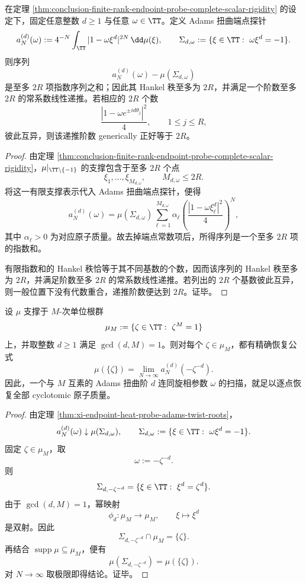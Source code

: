 \begin{corollary}\label{cor:conclusion-finite-rank-endpoint-probe-uniform-adams-recursion-closure}
在定理 \ref{thm:conclusion-finite-rank-endpoint-probe-complete-scalar-rigidity} 的设定下，固定任意整数 \(d\ge1\) 与任意 \(\omega\in\TT\)。定义 Adams 扭曲端点探针
\[
a_N^{(d)}(\omega):=
4^{-N}\int_{\TT}|1-\omega\xi^d|^{2N}\,\dd\mu(\xi),
\qquad
\Sigma_{d,\omega}:=\{\xi\in\TT:\ \omega\xi^d=-1\}.
\]
则序列
\[
a_N^{(d)}(\omega)-\mu(\Sigma_{d,\omega})
\]
是至多 \(2R\) 项指数序列之和；因此其 Hankel 秩至多为 \(2R\)，并满足一个阶数至多 \(2R\) 的常系数线性递推。若相应的 \(2R\) 个数
\[
\frac{|1-\omega e^{\pm i d\theta_j}|^2}{4},
\qquad 1\le j\le R,
\]
彼此互异，则该递推阶数 generically 正好等于 \(2R\)。
\end{corollary}
\begin{proof}
由定理 \ref{thm:conclusion-finite-rank-endpoint-probe-complete-scalar-rigidity}，\(\mu|_{\TT\setminus\{-1\}}\) 的支撑包含于至多 \(2R\) 个点
\[
\xi_1,\dots,\xi_{M_{d,\omega}},
\qquad M_{d,\omega}\le 2R.
\]
将这一有限支撑表示代入 Adams 扭曲端点探针，便得
\[
a_N^{(d)}(\omega)
=
\mu(\Sigma_{d,\omega})
\sum_{\ell=1}^{M_{d,\omega}}
\alpha_\ell
\left(\frac{|1-\omega\xi_\ell^d|^2}{4}\right)^N,
\]
其中 \(\alpha_\ell>0\) 为对应原子质量。故去掉端点常数项后，所得序列是一个至多 \(2R\) 项的指数和。

有限指数和的 Hankel 秩恰等于其不同基数的个数，因而该序列的 Hankel 秩至多为 \(2R\)，并满足阶数至多 \(2R\) 的常系数线性递推。若列出的 \(2R\) 个基数彼此互异，则一般位置下没有代数重合，递推阶数便达到 \(2R\)。证毕。
\end{proof}

\begin{theorem}\label{thm:conclusion-single-coprime-adams-twist-pointwise-cyclotomic-tomography}
设 \(\mu\) 支撑于 \(M\)-次单位根群
\[
\mu_M:=\{\zeta\in\TT:\ \zeta^M=1\}
\]
上，并取整数 \(d\ge1\) 满足 \(\gcd(d,M)=1\)。则对每个 \(\zeta\in\mu_M\)，都有精确恢复公式
\[
\mu(\{\zeta\})
=
\lim_{N\to\infty}a_N^{(d)}(-\zeta^{-d}).
\]
因此，一个与 \(M\) 互素的 Adams 扭曲阶 \(d\) 连同旋相参数 \(\omega\) 的扫描，就足以逐点恢复全部 cyclotomic 原子质量。
\end{theorem}
\begin{proof}
由定理 \ref{thm:xi-endpoint-heat-probe-adams-twist-roots}，
\[
a_N^{(d)}(\omega)\downarrow \mu(\Sigma_{d,\omega}),
\qquad
\Sigma_{d,\omega}:=\{\xi\in\TT:\ \omega\xi^d=-1\}.
\]
固定 \(\zeta\in\mu_M\)，取
\[
\omega:=-\zeta^{-d}.
\]
则
\[
\Sigma_{d,-\zeta^{-d}}
=
\{\xi\in\TT:\ \xi^d=\zeta^d\}.
\]
由于 \(\gcd(d,M)=1\)，幂映射
\[
\phi_d:\mu_M\to \mu_M,
\qquad
\xi\mapsto \xi^d
\]
是双射。因此
\[
\Sigma_{d,-\zeta^{-d}}\cap \mu_M=\{\zeta\}.
\]
再结合 \(\operatorname{supp}\mu\subseteq\mu_M\)，便有
\[
\mu(\Sigma_{d,-\zeta^{-d}})=\mu(\{\zeta\}).
\]
对 \(N\to\infty\) 取极限即得结论。证毕。
\end{proof}

